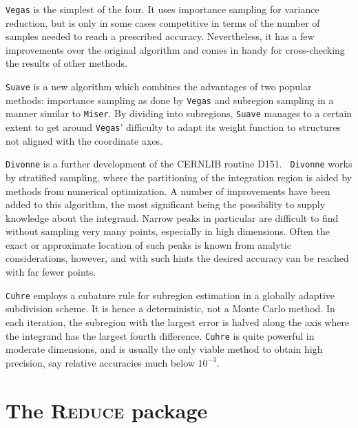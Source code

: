 \documentclass[11pt]{article}
\newcommand{\Reduce}{\textsc{Reduce}}
\begin{document}
\texttt{Vegas} is the simplest of the four.  It uses importance sampling for variance
reduction, but is only in some cases competitive in terms of the number of
samples needed to reach a prescribed accuracy.  Nevertheless, it has a few
improvements over the original algorithm and comes in handy for cross-checking
the results of other methods.

\texttt{Suave} is a new algorithm which combines the advantages of two popular
methods: importance sampling as done by \texttt{Vegas} and subregion sampling in
a manner similar to \texttt{Miser}. By dividing into subregions, \texttt{Suave}
manages to a certain extent to get around \texttt{Vegas}' difficulty to adapt
its weight function to structures not aligned with the coordinate axes.

\texttt{Divonne} is a further development of the CERNLIB routine D151. \texttt{
  Divonne} works by stratified sampling, where the partitioning of the
integration region is aided by methods from numerical optimization.  A number of
improvements have been added to this algorithm, the most significant being the
possibility to supply knowledge about the integrand.  Narrow peaks in particular
are difficult to find without sampling very many points, especially in high
dimensions.  Often the exact or approximate location of such peaks is known from
analytic considerations, however, and with such hints the desired accuracy can
be reached with far fewer points.

\texttt{Cuhre} employs a cubature rule for subregion estimation in a globally
adaptive subdivision scheme. It is hence a deterministic, not a Monte Carlo
method. In each iteration, the subregion with the largest error is halved along
the axis where the integrand has the largest fourth difference.  \texttt{Cuhre}
is quite powerful in moderate dimensions, and is usually the only viable method
to obtain high precision, say relative accuracies much below $10^{-3}$.


\section{The {\Reduce} package}
\end{document}
